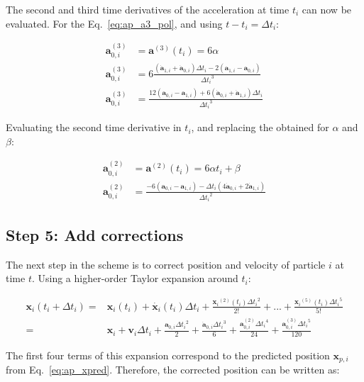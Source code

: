 \begin{appendixs}
	The second and third time derivatives of the acceleration at time $t_i$ can now be evaluated. For the Eq.~\eqref{eq:ap_a3_pol}, and using $t - t_i = \Delta t_i$:
	
	\begin{align}
		\mathbf{a}^{(3)}_{0, i} &= \mathbf{a}^{(3)} (t_i) = 6 \alpha \\
		\mathbf{a}^{(3)}_{0, i} &= 6 \frac{(\dot{\mathbf{a}}_{1, i} + \dot{\mathbf{a}}_{0, i})\Delta t_i - 2(\mathbf{a}_{1, i} - \mathbf{a}_{0, i})}{{\Delta t_i}^3} \\
		\mathbf{a}^{(3)}_{0, i} &= \frac{12 (\mathbf{a}_{0, i} - \mathbf{a}_{1, i}) + 6(\dot{\mathbf{a}}_{0, i} + \dot{\mathbf{a}}_{1, i})\Delta t_i}{{\Delta t_i}^3} \label{eq:ap_a3_ti}
	\end{align}
	
	Evaluating the second time derivative in $t_i$, and replacing the obtained for $\alpha$ and $\beta$:
	
	\begin{align}
		\mathbf{a}^{(2)}_{0, i} &= \mathbf{a}^{(2)} (t_i) = 6 \alpha t_i + \beta \\
		\mathbf{a}^{(2)}_{0, i} &= \frac{-6(\mathbf{a}_{0, i} - \mathbf{a}_{1, i}) - \Delta t_i(4\dot{\mathbf{a}}_{0, i} + 2\dot{\mathbf{a}}_{1, i})}{{\Delta t_i}^2}
	\end{align}
	
	
	\subsection{Step 5: Add corrections}
	
	The next step in the scheme is to correct position and velocity of particle $i$ at time $t$. Using a higher-order Taylor expansion around $t_i$:
	
	\begin{align}
		\mathbf{x}_i(t_i + \Delta t_i) =& \mathbf{x}_i(t_i) + \dot{\mathbf{x}_i}(t_i)\Delta t_i + \frac{{\mathbf{x}_i}^{(2)}(t_i){\Delta t_i}^2}{2!} + ... + \frac{{\mathbf{x}_i}^{(5)}(t_i){\Delta t_i}^5}{5!}\\
		=& \mathbf{x}_i + \mathbf{v}_i \Delta t_i + \frac{\mathbf{a}_{0, i} {\Delta t_i}^2}{2} + \frac{\dot{\mathbf{a}}_{0, i} {\Delta t_i}^3}{6} + \frac{\mathbf{a}^{(2)}_{0, i} {\Delta t_i}^4}{24} + \frac{\mathbf{a}^{(3)}_{0, i} {\Delta t_i}^5}{120}
	\end{align}
	
	The first four terms of this expansion correspond to the predicted position $\mathbf{x}_{p, i}$ from Eq.~\eqref{eq:ap_xpred}. Therefore, the corrected position can be written as:
	

\end{appendixs}
